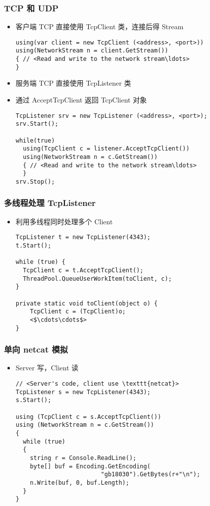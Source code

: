 \begin{frame}[fragile]
\frametitle{TCP 和 UDP}
\begin{itemize}
\item 客户端 TCP 直接使用 TcpClient 类，连接后得 Stream
\begin{lstlisting}[escapeinside=<>]
using(var client = new TcpClient (<address>, <port>))
using(NetworkStream n = client.GetStream())
{ // <Read and write to the network stream\ldots>
}
\end{lstlisting}
\item 服务端 TCP 直接使用 TcpListener 类
\item 通过 AcceptTcpClient 返回 TcpClient 对象
\begin{lstlisting}[escapeinside=<>]
TcpListener srv = new TcpListener (<address>, <port>);
srv.Start();

while(true)
  using(TcpClient c = listener.AcceptTcpClient())
  using(NetworkStream n = c.GetStream())
  { // <Read and write to the network stream\ldots>
  }
srv.Stop();
\end{lstlisting}
\end{itemize} 
\end{frame}

\begin{frame}[fragile]
\frametitle{多线程处理 TcpListener}
\begin{itemize}
\item 利用多线程同时处理多个 Client 
\begin{lstlisting}[escapeinside=<>]
TcpListener t = new TcpListener(4343);
t.Start();

while (true) {
  TcpClient c = t.AcceptTcpClient();
  ThreadPool.QueueUserWorkItem(toClient, c);
}

private static void toClient(object o) {
    TcpClient c = (TcpClient)o;
    <$\cdots\cdots$>
}
\end{lstlisting}
\end{itemize}
\end{frame}

\begin{frame}[fragile]
\frametitle{单向 netcat 模拟}
\begin{itemize}
\item Server 写，Client 读
\begin{lstlisting}[escapeinside=<>]
// <Server's code, client use \texttt{netcat}>
TcpListener s = new TcpListener(4343);
s.Start();

using (TcpClient c = s.AcceptTcpClient())
using (NetworkStream n = c.GetStream())
{
  while (true)
  {
    string r = Console.ReadLine();
    byte[] buf = Encoding.GetEncoding(
                        "gb18030").GetBytes(r+"\n");
    n.Write(buf, 0, buf.Length);
  }
}
\end{lstlisting}
\end{itemize}
\end{frame}

